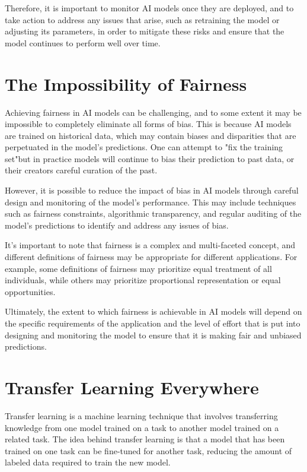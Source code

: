 Therefore, it is important to monitor AI models once they are deployed, and to take action to address any issues that arise, such as retraining the model or adjusting its parameters, in order to mitigate these risks and ensure that the model continues to perform well over time.

\section{The Impossibility of Fairness}

Achieving fairness in AI models can be challenging, and to some extent it may be impossible to completely eliminate all forms of bias. This is because AI models are trained on historical data, which may contain biases and disparities that are perpetuated in the model's predictions. One can attempt to "fix the training set"but in practice models will continue to bias their prediction to past data, or their creators careful curation of the past. 

However, it is possible to reduce the impact of bias in AI models through careful design and monitoring of the model's performance. This may include techniques such as fairness constraints, algorithmic transparency, and regular auditing of the model's predictions to identify and address any issues of bias.

It's important to note that fairness is a complex and multi-faceted concept, and different definitions of fairness may be appropriate for different applications. For example, some definitions of fairness may prioritize equal treatment of all individuals, while others may prioritize proportional representation or equal opportunities.

Ultimately, the extent to which fairness is achievable in AI models will depend on the specific requirements of the application and the level of effort that is put into designing and monitoring the model to ensure that it is making fair and unbiased predictions.

\section{Transfer Learning Everywhere}

Transfer learning is a machine learning technique that involves transferring knowledge from one model trained on a task to another model trained on a related task. The idea behind transfer learning is that a model that has been trained on one task can be fine-tuned for another task, reducing the amount of labeled data required to train the new model.

